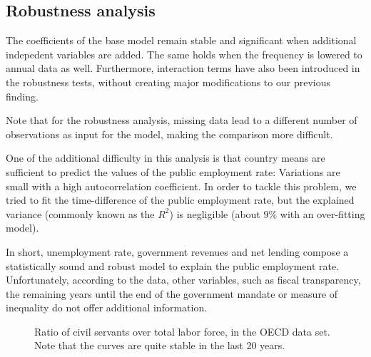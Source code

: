 \subsection{Robustness analysis}

The coefficients of the base model remain stable and significant when
additional indepedent variables are added. The same holds when the frequency is
lowered to annual data as well. Furthermore, interaction terms have also been
introduced in the robustness tests, without creating major modifications to our
previous finding.

Note that for the robustness analysis, missing data lead to a different number
of observations as input for the model, making the comparison more difficult.

One of the additional difficulty in this analysis is that country means are
sufficient to predict the values of the public employment rate: Variations are
small with a high autocorrelation coefficient. In order to tackle this problem,
we tried to fit the time-difference of the public employment rate, but the
explained variance (commonly known as the $R^2$) is negligible (about $9\%$
with an over-fitting model).

In short, unemployment rate, government revenues and net lending compose a
statistically sound and robust model to explain the public employment
rate. Unfortunately, according to the data, other variables, such as fiscal
transparency, the remaining years until the end of the government mandate or
measure of inequality do not offer additional information.


\begin{landscape}
  \begin{figure}[!ht] \centering
    
    \caption{Ratio of civil servants over total labor force, in the OECD data
      set. Note that the curves are quite stable in the last 20 years.}
    \label{fig:egr}
  \end{figure}
  \linespread{1}\selectfont
  
  \linespread{1.5}\selectfont
\end{landscape}

